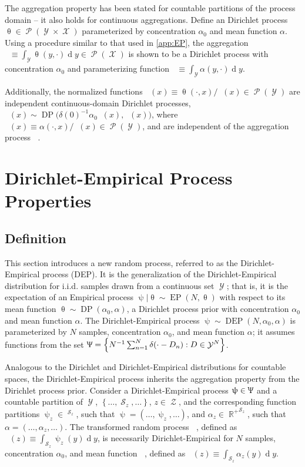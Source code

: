 \documentclass[12pt]{report}
\DeclareMathOperator{\drm}{\mathrm{d}}
\DeclareMathOperator{\Xcal}{\mathcal{X}}
\DeclareMathOperator{\Ycal}{\mathcal{Y}}
\DeclareMathOperator{\Zcal}{\mathcal{Z}}
\DeclareMathOperator{\Scal}{\mathcal{S}}
\DeclareMathOperator{\Pcal}{\mathcal{P}}
\DeclareMathOperator{\Rbb}{\mathbb{R}}
\DeclareMathOperator{\Rbbgeq}{\mathbb{R}_{\geq 0}}
\DeclareMathOperator{\DP}{\mathrm{DP}}
\DeclareMathOperator{\EP}{\mathrm{EP}}
\DeclareMathOperator{\DEP}{\mathrm{DEP}}
\DeclareMathOperator{\upthetam}{\uptheta_\text{m}}
\DeclareMathOperator{\upthetac}{\uptheta_\text{c}}
\DeclareMathOperator{\uppsim}{\uppsi_\text{m}}
\DeclareMathOperator{\alpham}{\alpha_\text{m}}
\DeclareMathOperator{\alphac}{\alpha_\text{c}}
\begin{document}
The aggregation property has been stated for countable partitions of the process domain -- it also holds for continuous aggregations. Define an Dirichlet process $\uptheta \in \Pcal(\Ycal \times \Xcal)$ parameterized by concentration $\alpha_0$ and mean function $\alpha$. Using a procedure similar to that used in \ref{app:EP}, the aggregation $\upthetam \equiv \int_{\Ycal} \uptheta(y,\cdot) {\drm}y \in \Pcal(\Xcal)$ is shown to be a Dirichlet process with concentration $\alpha_0$ and parameterizing function $\alpham \equiv \int_{\Ycal} \alpha(y,\cdot) {\drm}y$. 

Additionally, the normalized functions $\upthetac(x) \equiv \uptheta(\cdot,x) / \upthetam(x) \in \Pcal(\Ycal)$ are independent continuous-domain Dirichlet processes, $\upthetac(x) \sim \DP\big(\delta(0) ^{-1} \alpha_0 \alpham(x), \alphac(x)\big)$, where $\alphac(x) \equiv \alpha(\cdot,x) / \alpham(x) \in \Pcal(\Ycal)$, and are independent of the aggregation process $\upthetam$.









\section{Dirichlet-Empirical Process Properties} \label{app:DEP}


\subsection{Definition}

This section introduces a new random process, referred to as the Dirichlet-Empirical process (DEP). It is the generalization of the Dirichlet-Empirical distribution for i.i.d. samples drawn from a continuous set $\Ycal$; that is, it is the expectation of an Empirical process $\uppsi | \uptheta \sim \EP(N,\uptheta)$ with respect to its mean function $\uptheta \sim \DP(\alpha_0,\alpha)$, a Dirichlet process prior with concentration $\alpha_0$ and mean function $\alpha$. The Dirichlet-Empirical process $\uppsi \sim \DEP(N,\alpha_0,\alpha)$ is parameterized by $N$ samples, concentration $\alpha_0$, and mean function $\alpha$; it assumes functions from the set $\Uppsi = \left\{ N^{-1} \sum_{n=1}^N \delta(\cdot - D_n) : D \in \Ycal^N \right\}$.

Analogous to the Dirichlet and Dirichlet-Empirical distributions for countable spaces, the Dirichlet-Empirical process inherits the aggregation property from the Dirichlet process prior. Consider a Dirichlet-Empirical process $\uppsi \in \Uppsi$ and a countable partition of $\Ycal$, $\left\{ \ldots,\Scal_z,\ldots \right\}$, $z \in \Zcal$, and the corresponding function partitions $\uppsi_z \in \Rbbgeq^{\Scal_z}$, such that $\uppsi = \left( \ldots,\uppsi_z,\ldots \right)$, and $\alpha_z \in {\Rbb^+}^{\Scal_z}$, such that $\alpha = \left( \ldots,\alpha_z,\ldots \right)$. The transformed random process $\uppsim$, defined as $\uppsim(z) \equiv \int_{\Scal_z} \uppsi_z(y) {\drm}y$, is necessarily Dirichlet-Empirical for $N$ samples, concentration $\alpha_0$, and mean function $\alpham$, defined as $\alpham(z) \equiv \int_{\Scal_z} \alpha_z(y) {\drm}y$.
\end{document}
